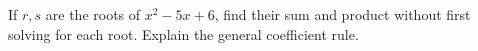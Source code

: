 If $r,s$ are the roots of $x^2-5x+6$, find their sum and product without first solving for each root. Explain the general coefficient rule.
